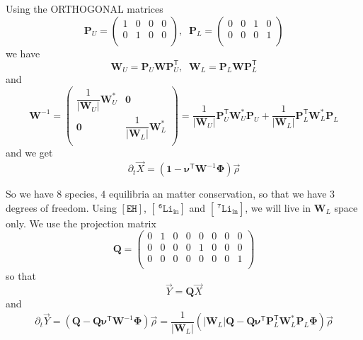 \documentclass[aps,onecolumn,11pt]{revtex4}
\newcommand{\mychem}[1]{\mathtt{#1}}
\newcommand{\myconc}[1]{\left\lbrack{#1}\right\rbrack}
\newcommand{\spLi}[1]{{~^{\mychem{#1}}\mychem{Li}}}
\newcommand{\spLiIn}[1]{{\spLi{#1}}_{\mathrm{in}}}
\newcommand{\LiIn}[1]{\myconc{\spLiIn{#1}}}
\newcommand{\spEHin}{\mychem{EH}}
\newcommand{\EHin}{\myconc{\spEHin}}
\newcommand{\mytrn}[1]{{#1}^{\!\mathsf{T}}}
\newcommand{\mymat}[1]{{\bm{#1}}}
\newcommand{\mydet}[1]{{\left|{#1}\right|}}
\begin{document}
Using the ORTHOGONAL matrices
\begin{equation}
\mymat{P}_U = 
\begin{pmatrix}
1 & 0 & 0 & 0\\
0 & 1 & 0 & 0\\
\end{pmatrix},\;\;
\mymat{P}_L = 
\begin{pmatrix}
0 & 0 & 1 & 0\\
0 & 0 & 0 & 1\\
\end{pmatrix}
\end{equation}
we have
\begin{equation}
\mymat{W}_U = \mymat{P}_U \mymat{W} \mytrn{\mymat{P}}_U, \;\;
\mymat{W}_L = \mymat{P}_L \mymat{W} \mytrn{\mymat{P}}_L
\end{equation}
and
\begin{equation}
\mymat{W}^{-1} = 
\begin{pmatrix}
\dfrac{1}{\mydet{\mymat{W}_U}} \mymat{W}_U^\ast & \mymat{0} \\
\mymat{0} & \dfrac{1}{\mydet{\mymat{W}_L}} \mymat{W}_L^\ast \\
\end{pmatrix}
=
\dfrac{1}{\mydet{\mymat{W}_U}} \mytrn{\mymat{P}}_U \mymat{W}_U^\ast \mymat{P}_U
+
\dfrac{1}{\mydet{\mymat{W}_L}} \mytrn{\mymat{P}}_L \mymat{W}_L^\ast \mymat{P}_L
\end{equation}
and we get
\begin{equation}
\partial_t \vec{X} = \left(\mymat{1} - \mytrn{\mymat{\nu}} \mymat{W}^{-1} \mymat{\Phi} \right) \vec{\rho}
\end{equation}

So we have $8$ species, $4$ equilibria an matter conservation, so that we have 3 degrees of freedom.
Using $\EHin$, $\LiIn{6}$ and $\LiIn{7}$, we will live in $\mymat{W}_L$ space only.
We use the projection matrix
\begin{equation}
	\mymat{Q} = 
	\begin{pmatrix}
	0 & 1 & 0 & 0 &0 & 0 & 0 & 0\\
	0 & 0 & 0 & 0 &1 & 0 & 0 & 0\\
	0 & 0 & 0 & 0 &0 & 0 & 0 & 1\\
	\end{pmatrix}
\end{equation}
so that
\begin{equation}
	\vec{Y} = \mymat{Q}\vec{X}
\end{equation}
and
\begin{equation}
	\partial_t \vec{Y} = 
	\left(
	\mymat{Q} - \mymat{Q} \mytrn{\mymat{\nu}} \mymat{W}^{-1} \mymat{\Phi} \right) \vec{\rho}
	=
	\dfrac{1}{\mydet{\mymat{W}_L}}
	\left(
		\mydet{\mymat{W}_L}\mymat{Q} - \mymat{Q} \mytrn{\mymat{\nu}} \mytrn{\mymat{P}}_L \mymat{W}_L^\ast \mymat{P}_L \mymat{\Phi} 
	\right)
	 \vec{\rho}
\end{equation}
\end{document}
